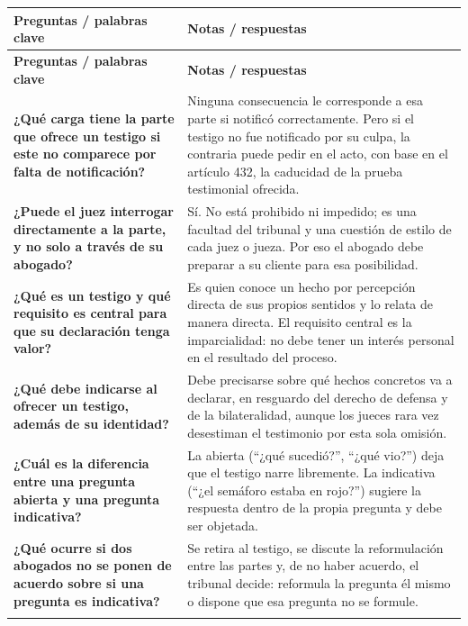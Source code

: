 \documentclass[12pt,oneside]{book}
\begin{document}
\begin{longtable}{
    >{\raggedright\arraybackslash}p{}
    >{\raggedright\arraybackslash}p{}
}
\toprule
\textbf{Preguntas / palabras clave} & \textbf{Notas / respuestas} \\
\midrule
\endfirsthead
\toprule
\textbf{Preguntas / palabras clave} & \textbf{Notas / respuestas} \\
\midrule
\endhead

\textbf{¿Qué carga tiene la parte que ofrece un testigo si este no comparece por falta de notificación?} &
Ninguna consecuencia le corresponde a esa parte si notificó correctamente. Pero si el testigo no fue notificado por su culpa, la contraria puede pedir en el acto, con base en el artículo 432, la caducidad de la prueba testimonial ofrecida. \\
\addlinespace[0.5em]

\textbf{¿Puede el juez interrogar directamente a la parte, y no solo a través de su abogado?} &
Sí. No está prohibido ni impedido; es una facultad del tribunal y una cuestión de estilo de cada juez o jueza. Por eso el abogado debe preparar a su cliente para esa posibilidad. \\
\addlinespace[0.5em]

\textbf{¿Qué es un testigo y qué requisito es central para que su declaración tenga valor?} &
Es quien conoce un hecho por percepción directa de sus propios sentidos y lo relata de manera directa. El requisito central es la imparcialidad: no debe tener un interés personal en el resultado del proceso. \\
\addlinespace[0.5em]

\textbf{¿Qué debe indicarse al ofrecer un testigo, además de su identidad?} &
Debe precisarse sobre qué hechos concretos va a declarar, en resguardo del derecho de defensa y de la bilateralidad, aunque los jueces rara vez desestiman el testimonio por esta sola omisión. \\
\addlinespace[0.5em]

\textbf{¿Cuál es la diferencia entre una pregunta abierta y una pregunta indicativa?} &
La abierta (``¿qué sucedió?'', ``¿qué vio?'') deja que el testigo narre libremente. La indicativa (``¿el semáforo estaba en rojo?'') sugiere la respuesta dentro de la propia pregunta y debe ser objetada. \\
\addlinespace[0.5em]

\textbf{¿Qué ocurre si dos abogados no se ponen de acuerdo sobre si una pregunta es indicativa?} &
Se retira al testigo, se discute la reformulación entre las partes y, de no haber acuerdo, el tribunal decide: reformula la pregunta él mismo o dispone que esa pregunta no se formule. \\
\addlinespace[0.5em]


\end{longtable}
\end{document}
